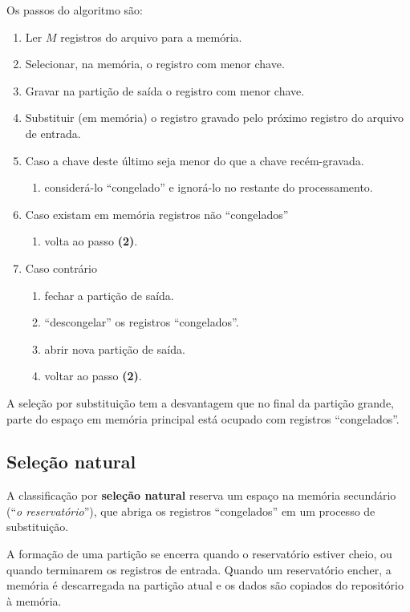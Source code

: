Os passos do algoritmo são:
\begin{enumerate}
\item Ler $M$ registros do arquivo para a memória.
\item Selecionar, na memória, o registro com menor chave.
\item Gravar na partição de saída o registro com menor chave.
\item Substituir (em memória) o registro gravado pelo próximo registro
do arquivo de entrada.
\item Caso a chave deste último seja menor do que a chave recém-gravada.
	\begin{enumerate}
	\item considerá-lo ``congelado'' e ignorá-lo no restante do processamento.
	\end{enumerate}
\item Caso existam em memória registros não ``congelados''
	\begin{enumerate}
	\item volta ao passo {\bf (2)}.
	\end{enumerate}
\item Caso contrário
	\begin{enumerate}
	\item fechar a partição de saída.
	\item ``descongelar'' os registros ``congelados''.
	\item abrir nova partição de saída.
	\item voltar ao passo {\bf (2)}.
	\end{enumerate}
\end{enumerate}

A seleção por substituição tem a desvantagem que no final da partição grande, 
parte do espaço em memória principal está ocupado com registros ``congelados''.

\subsection{Seleção natural}

A classificação por {\bf seleção natural} reserva um espaço na memória 
secundário (``\emph{o reservatório}''), que abriga os registros
``congelados'' em um processo de substituição.

A formação de uma partição se encerra quando o reservatório estiver cheio, ou
quando terminarem os registros de entrada.
Quando um reservatório encher, a memória é descarregada na partição atual
e os dados são copiados do repositório à memória.

